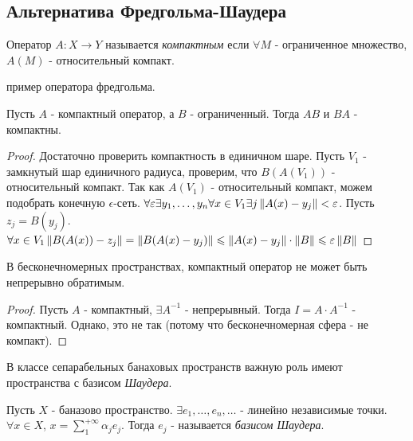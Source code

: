 \subsection{Альтернатива Фредгольма-Шаудера}

\begin{definition}
    Оператор $A: X \rightarrow Y$ называется \textit{компактным} если $\forall M$ - ограниченное множество, $A(M)$ - относительный компакт.
\end{definition}

\todo пример оператора фредгольма.

\begin{statement}
    Пусть $A$ - компактный оператор, а $B$ - ограниченный. Тогда $AB$ и $BA$ - компактны.
\end{statement}
 
\begin{proof}
    Достаточно проверить компактность в единичном шаре.
    Пусть $V_1$ - замкнутый шар единичного радиуса, проверим, что $B(A(V_1))$ - относительный компакт.
    Так как $A(V_1)$ - относительный компакт, можем подобрать конечную $\epsilon$-сеть. 
    $\forall \varepsilon \exists y_1,  \dots, y_n \forall x \in V_1 \exists j \left\|A(x) - y_j\right\| < \varepsilon$. Пусть $z_j = B(y_j)$. 
    $\forall x \in V_1 \left\|B(A(x)) - z_j\right\| = \left\|B(A(x) - y_j)\right\| \leqslant \left\|A(x) - y_j\right\| \cdot \left\|B\right\| \leqslant \varepsilon\left\|B\right\|$
\end{proof}

\begin{statement}
    В бесконечномерных пространствах, компактный оператор не может быть непрерывно обратимым.
\end{statement}
\begin{proof}
    Пусть $A$ - компактный, $\exists A^{-1}$ - непрерывный. Тогда $I = A\cdot A^{-1}$ - компактный. Однако, это не так (потому что бесконечномерная сфера - не компакт).
\end{proof}

В классе сепарабельных банаховых пространств важную роль имеют пространства с базисом \textit{Шаудера}.

\begin{definition}
    Пусть $X$ - баназово пространство. $\exists e_1, \dots, e_n, \dots$ - линейно независимые точки. $\forall x \in X$, $x = \sum_{1}^{+\infty} \alpha_j e_j$.
    Тогда ${e_j}$ - называется \textit{базисом Шаудера}.
\end{definition}

